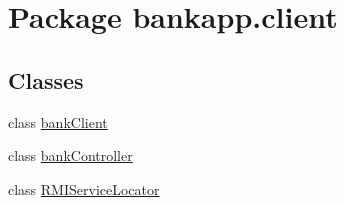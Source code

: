 \hypertarget{namespacebankapp_1_1client}{}\section{Package bankapp.\+client}
\label{namespacebankapp_1_1client}
\subsection*{Classes}
\begin{DoxyCompactItemize}
\item 
class \hyperlink{classbankapp_1_1client_1_1bank_client}{bank\+Client}
\item 
class \hyperlink{classbankapp_1_1client_1_1bank_controller}{bank\+Controller}
\item 
class \hyperlink{classbankapp_1_1client_1_1_r_m_i_service_locator}{R\+M\+I\+Service\+Locator}
\end{DoxyCompactItemize}
